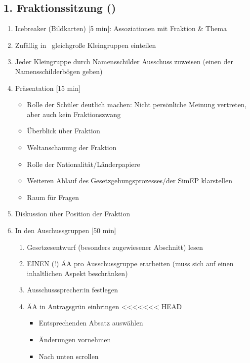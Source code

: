 \documentclass{article}
\begin{document}
	\subsection{1. Fraktionssitzung (\timeFrakOne)}
	\begin{enumerate}
		\item Icebreaker (Bildkarten) [5 min]: \newline Assoziationen mit Fraktion \& Thema
        \item Zufällig in \anzahlcomm\ gleichgroße Kleingruppen einteilen
        \item Jeder Kleingruppe durch Namensschilder Ausschuss zuweisen (einen der Namensschilderbögen geben)
		\item Präsentation [15 min]
		\begin{itemize}
			\item Rolle der Schüler deutlich machen: \newline
            Nicht persönliche Meinung vertreten, aber auch kein Fraktionszwang
			\item Überblick über Fraktion
			\item Weltanschauung der Fraktion
			\item Rolle der Nationalität/Länderpapiere
			\item Weiteren Ablauf des Gesetzgebungsprozesses/der SimEP klarstellen
            \item Raum für Fragen
		\end{itemize}
		\item Diskussion über Position der Fraktion \THEMA \newline [10 min]
		\item In den Auschussgruppen [50 min]
		\begin{enumerate}
			\item Gesetzesentwurf (besonders zugewiesener Abschnitt) lesen
			\item EINEN (!) ÄA pro Ausschussgruppe erarbeiten \newline (muss sich auf einen inhaltlichen Aspekt beschränken)
	        \item Ausschusssprecher:in festlegen		
            \item ÄA in Antragsgrün einbringen
<<<<<<< HEAD
            \begin{itemize}
            		\item Entsprechenden Absatz auswählen
            		\item Änderungen vornehmen
            		\item Nach unten scrollen

\end{itemize}
\end{enumerate}
\end{enumerate}
\end{document}
